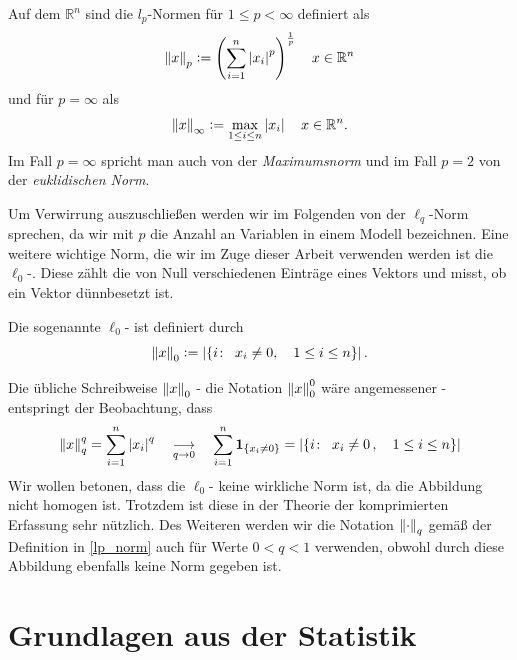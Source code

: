 \begin{defn} 
\label{lp_norm}
Auf dem $\mathbb{R}^n$ sind die $l_p$-Normen für $1 \leq p < \infty$ definiert als
$$\left\lVert x \right\rVert_p \vcentcolon= \left( \sum_{i=1}^{n} \left\lvert x_i \right\rvert^{p} \right) ^{\frac{1}{p}} \quad x \in \mathbb{R}^{n}$$
und für $p = \infty$ als
$$\left\lVert x \right\rVert_{\infty} \vcentcolon= \max_{1 \leq i \leq n} \left\lvert x_i \right\rvert \quad x \in \mathbb{R}^{n}.$$
Im Fall $p = \infty$ spricht man auch von der \textit{Maximumsnorm} und im Fall $p = 2$ von der \textit{euklidischen Norm}.
\end{defn}

Um Verwirrung auszuschließen werden wir im Folgenden von der $\ell_q$-Norm sprechen, da wir mit $p$ die Anzahl an Variablen in einem Modell bezeichnen. Eine weitere wichtige Norm, die wir im Zuge dieser Arbeit verwenden werden ist die $\ell_0$-. Diese zählt die von Null verschiedenen Einträge eines Vektors und misst, ob ein Vektor dünnbesetzt ist.

\begin{defn}
Die sogenannte $\ell_0$- ist definiert durch
$$\left\lVert x \right\rVert_{0} \vcentcolon= \left|\{i \colon \enspace x_i \neq 0 , \quad 1 \leq i \leq n\}\right|.$$
\end{defn}

Die übliche Schreibweise $\left\lVert x \right\rVert_0$ - die Notation $\left\lVert x \right\rVert_{0}^{0}$ wäre angemessener - entspringt der Beobachtung, dass 
$$\left\lVert x \right\rVert_{q}^{q} = \sum_{i=1}^{n} \left\lvert x_i \right\rvert^q \quad \underset{q \rightarrow 0}{\longrightarrow} \quad \sum_{i=1}^{n} \mathbf{1}_{\{x_i \neq 0\}} = \left|\{i \colon \enspace x_i \neq 0\, , \quad 1 \leq i \leq n\}\right|$$
Wir wollen betonen, dass die $\ell_0$- keine wirkliche Norm ist, da die Abbildung nicht homogen ist. Trotzdem ist diese  in der Theorie der komprimierten Erfassung sehr nützlich. Des Weiteren werden wir die Notation $\left\lVert \cdot \right\rVert_q$ gemäß der Definition in \ref{lp_norm} auch für Werte $0 < q < 1$ verwenden, obwohl durch diese Abbildung ebenfalls keine Norm gegeben ist.




\section{Grundlagen aus der Statistik}

